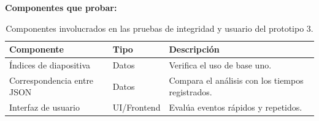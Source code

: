 \documentclass[12pt,letterpaper]{article}
\begin{document}
\textbf{Componentes que probar:}
\begin{table}[H]
\centering
\begin{tabular}{|L{0.34\textwidth}|L{0.18\textwidth}|L{0.38\textwidth}|}
\hline
\textbf{Componente} & \textbf{Tipo} & \textbf{Descripción} \\ \hline
Índices de diapositiva & Datos & Verifica el uso de base uno. \\ \hline
Correspondencia entre JSON & Datos & Compara el análisis con los tiempos registrados. \\ \hline
Interfaz de usuario & UI/Frontend & Evalúa eventos rápidos y repetidos. \\ \hline
\end{tabular}
\caption{Componentes involucrados en las pruebas de integridad y usuario del prototipo 3.}
\label{tab:componentes-integridad-tt3}
\end{table}
\end{document}
